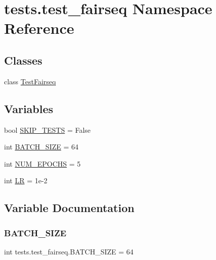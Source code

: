 \hypertarget{namespacetests_1_1test__fairseq}{}\section{tests.\+test\+\_\+fairseq Namespace Reference}
\label{namespacetests_1_1test__fairseq}
\subsection*{Classes}
\begin{DoxyCompactItemize}
\item 
class \hyperlink{classtests_1_1test__fairseq_1_1TestFairseq}{Test\+Fairseq}
\end{DoxyCompactItemize}
\subsection*{Variables}
\begin{DoxyCompactItemize}
\item 
bool \hyperlink{namespacetests_1_1test__fairseq_afdc5e6b35093942468ef6f4beebc4447}{S\+K\+I\+P\+\_\+\+T\+E\+S\+TS} = False
\item 
int \hyperlink{namespacetests_1_1test__fairseq_afd20f3a8794ae44033ce670494e59c93}{B\+A\+T\+C\+H\+\_\+\+S\+I\+ZE} = 64
\item 
int \hyperlink{namespacetests_1_1test__fairseq_a3049dc3ba38f38806819ce7bf83f6d5a}{N\+U\+M\+\_\+\+E\+P\+O\+C\+HS} = 5
\item 
int \hyperlink{namespacetests_1_1test__fairseq_aabf08f5836c5f8b496cf6f6ab5bb62aa}{LR} = 1e-\/2
\end{DoxyCompactItemize}


\subsection{Variable Documentation}
\mbox{\label{namespacetests_1_1test__fairseq_afd20f3a8794ae44033ce670494e59c93}} 
\subsubsection{\texorpdfstring{B\+A\+T\+C\+H\+\_\+\+S\+I\+ZE}{BATCH\_SIZE}}
{\footnotesize\ttfamily int tests.\+test\+\_\+fairseq.\+B\+A\+T\+C\+H\+\_\+\+S\+I\+ZE = 64}



